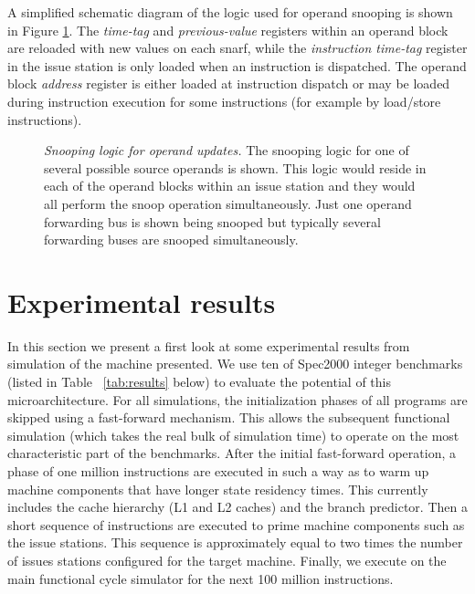 \documentclass[10pt,twocolumn,dvips]{article}
\begin{document}
A simplified schematic diagram of the logic used for operand snooping
is shown in Figure \ref{fig:source}.
The {\em time-tag} and
{\em previous-value} registers within an operand block
are reloaded with new values on each snarf,
while the
{\em instruction time-tag} register in the issue station
is only loaded when an instruction is dispatched.
The operand block {\em address} register is either loaded at instruction
dispatch or may be loaded during instruction execution for some
instructions
(for example by load/store instructions).
%
\begin{figure}
\scriptsize {
}
\caption{{\em Snooping logic for operand updates.} 
The snooping
logic for one of several possible source operands is shown.
This logic would reside in each of the operand blocks within an 
issue station and they would all perform the snoop operation
simultaneously.
Just one operand forwarding bus is shown being snooped but
typically several forwarding buses are snooped simultaneously.}
\label{fig:source}
\end{figure}
%
%
\vspace{-0.15in}
\section{Experimental results}
%
In this section we present a first look at some
experimental results from simulation
of the machine presented.
We use ten of Spec2000 integer benchmarks 
(listed in Table ~\ref{tab:results} below) to evaluate the potential
of this microarchitecture. 
For all simulations, the initialization phases of all
programs are skipped using a fast-forward mechanism.
This allows the subsequent functional simulation (which takes
the real bulk of simulation time) to operate on the most
characteristic part of the benchmarks.
After the initial fast-forward operation, a phase of one million 
instructions are executed in such
a way as to warm up machine components that have longer
state residency times.  This currently includes the cache hierarchy
(L1 and L2 caches) and the branch predictor.
Then a short sequence of instructions are 
executed to prime machine components such as the issue stations.
This sequence is approximately equal to two times the number
of issues stations configured for the target machine.
Finally, we execute on the main functional cycle simulator
for the next 100 million instructions.  
\end{document}
